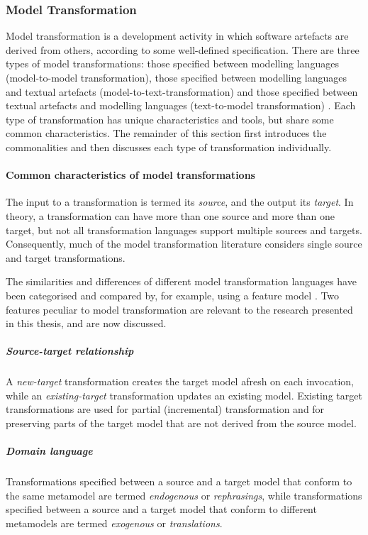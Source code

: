 \subsubsection{Model Transformation}
\label{subsubsec:model_transformation}
Model transformation is a development activity in which software artefacts are derived from others, according to some well-defined specification. There \cc are three types of model transformations: those specified between modelling languages (model-to-model transformation), those specified between modelling languages and textual artefacts (model-to-text-transformation) and those specified between textual artefacts and modelling languages (text-to-model transformation) \cite{kleppe03mda}. Each type of transformation has unique characteristics and tools, but share some common characteristics. The remainder of this section first introduces the commonalities and then discusses each type of transformation individually.

\paragraph{Common characteristics of model transformations}
The input to a transformation is termed its \emph{source}, and the output its \emph{target}. In theory, a transformation can have more than one source and more than one target, but not all transformation languages support multiple sources and targets. Consequently, much of the model transformation literature considers single source and target transformations.

The \cc similarities and differences of different model transformation languages have been categorised and compared by, for example, using a feature model \cite{czarnecki06survey}. Two features peculiar to model transformation are relevant to the research presented in this thesis, and are now discussed. 

\subparagraph{Source-target relationship} A \emph{new-target} transformation creates the target model afresh on each invocation, while an \emph{existing-target} transformation updates an existing model. Existing target transformations are used for partial (incremental) transformation and for preserving parts of the target model that are not derived from the source model.

\subparagraph{Domain language} Transformations specified between a source and a target model that conform to the same metamodel are termed \emph{endogenous} or \emph{rephrasings}, while transformations specified between a source and a target model that conform to different metamodels are termed \emph{exogenous} or \emph{translations}.

